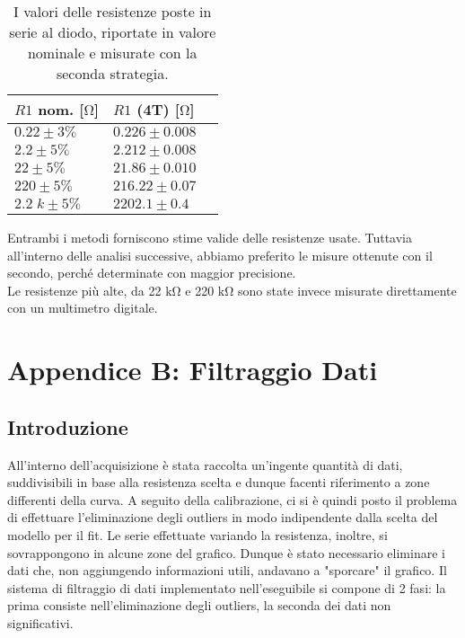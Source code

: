 \documentclass{article}[a4paper, oneside, 11pt]
\begin{document}
\begin{table}[H]
	\begin{center}
		\begin{tabular}{lll}
		\toprule
		$R1$ nom. [$\si{\ohm}$] & $R1$ (4T) [$\si{\ohm}$] \\
		\midrule
		\midrule
		$0.22 \pm 3 \% $     & $0.226 \pm 0.008$ \\
		$2.2 \pm 5 \% $     & $2.212 \pm 0.008$ \\
		$22 \pm 5 \% $     & $21.86 \pm 0.010$ \\
		$220 \pm 5 \% $     & $216.22 \pm 0.07$ \\
		$2.2\; \si{k} \pm 5 \% $ & $2202.1 \pm 0.4$ \\
		\bottomrule
    	\end{tabular}
    \caption{I valori delle resistenze poste in serie al diodo, riportate in
       		 valore nominale e misurate con la seconda strategia. 
			 \label{tab: res_4T}}
	\end{center}
\end{table}

Entrambi i metodi forniscono stime valide delle resistenze usate. Tuttavia
all'interno delle analisi successive, abbiamo preferito le misure ottenute
con il secondo, perch\'e determinate con maggior precisione.\\
Le resistenze pi\`u alte, da 22 $\si{\kohm}$ e 220 $\si{\kohm}$ sono state
invece misurate direttamente con un multimetro digitale.

\section{Appendice B: Filtraggio Dati}\label{app: B}
\subsection{Introduzione}
All'interno dell'acquisizione \`e stata raccolta un'ingente quantit\`a di dati,
suddivisibili in base alla resistenza scelta e dunque facenti riferimento
a zone differenti della curva. A seguito della calibrazione, ci si \`e quindi
posto il problema di effettuare l'eliminazione degli outliers in modo
indipendente dalla scelta del modello per il fit. Le serie effettuate
variando la resistenza, inoltre, si sovrappongono in alcune zone del
grafico. Dunque \`e stato necessario eliminare i dati che, non aggiungendo
informazioni utili, andavano a "sporcare" il grafico. Il sistema di filtraggio
di dati implementato nell'eseguibile si compone di 2 fasi:
la prima consiste nell'eliminazione degli outliers, la seconda dei dati non
significativi.
\end{document}
